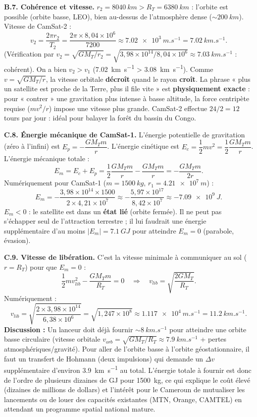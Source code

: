 \documentclass[11pt]{article}
\begin{document}
\begin{exoresolu}
\textbf{B.7. Cohérence et vitesse.} $r_2 = \SI{8040}{km} > R_T = \SI{6380}{km}$ : l'orbite est possible (orbite basse, LEO), bien au-dessus de l'atmosphère dense ($\sim \SI{200}{km}$).
Vitesse de CamSat-2 :
\[
v_2 = \frac{2\pi r_2}{T_2} = \frac{2\pi \times 8,04\times 10^{6}}{7200} \approx \SI{7,02e3}{m.s^{-1}} = \SI{7,02}{km.s^{-1}}.
\]
(Vérification par $v_2 = \sqrt{GM_T/r_2} = \sqrt{3,98\times 10^{14} / 8,04\times 10^{6}} \approx \SI{7,03}{km.s^{-1}}$ : cohérent).
On a bien $v_2 > v_1$ (\SI{7,02}{km.s^{-1}} > \SI{3,08}{km.s^{-1}}). Comme $v = \sqrt{GM_T/r}$, la vitesse orbitale \textbf{décroît} quand le rayon \textbf{croît}. La phrase « plus un satellite est proche de la Terre, plus il file vite » est \textbf{physiquement exacte} : pour « contrer » une gravitation plus intense à basse altitude, la force centripète requise ($mv^2/r$) impose une vitesse plus grande. CamSat-2 effectue $24/2 = 12$ tours par jour : idéal pour balayer la forêt du bassin du Congo.

\textbf{C.8. Énergie mécanique de CamSat-1.}
L'énergie potentielle de gravitation (zéro à l'infini) est $E_p = -\dfrac{G M_T m}{r}$.
L'énergie cinétique est $E_c = \dfrac{1}{2}m v^2 = \dfrac{1}{2}\dfrac{G M_T m}{r}$.
L'énergie mécanique totale :
\[
E_m = E_c + E_p = \frac{1}{2}\frac{G M_T m}{r} - \frac{G M_T m}{r} = -\frac{G M_T m}{2r}.
\]
Numériquement pour CamSat-1 ($m = \SI{1500}{kg}$, $r_1 = \SI{4,21e7}{m}$) :
\[
E_m = -\frac{3,98\times 10^{14} \times 1500}{2 \times 4,21\times 10^{7}}
\approx -\frac{5,97\times 10^{17}}{8,42\times 10^{7}}
\approx \SI{-7,09e9}{J}.
\]
$E_m < 0$ : le satellite est dans un \textbf{état lié} (orbite fermée). Il ne peut pas s'échapper seul de l'attraction terrestre ; il lui faudrait une énergie supplémentaire d'au moins $|E_m| = \SI{7,1}{GJ}$ pour atteindre $E_m = 0$ (parabole, évasion).

\textbf{C.9. Vitesse de libération.}
C'est la vitesse minimale à communiquer au sol ($r = R_T$) pour que $E_m = 0$ :
\[
\frac{1}{2}m v_{lib}^2 - \frac{G M_T m}{R_T} = 0
\quad\Longrightarrow\quad
\boxed{v_{lib} = \sqrt{\frac{2 G M_T}{R_T}}}.
\]
Numériquement :
\[
v_{lib} = \sqrt{\frac{2 \times 3,98\times 10^{14}}{6,38\times 10^{6}}}
= \sqrt{1,247\times 10^{8}} \approx \SI{1,117e4}{m.s^{-1}} = \SI{11,2}{km.s^{-1}}.
\]
\textbf{Discussion :} Un lanceur doit déjà fournir $\sim \SI{8}{km.s^{-1}}$ pour atteindre une orbite basse circulaire (vitesse orbitale $v_{orb} = \sqrt{GM_T/R_T} \approx \SI{7,9}{km.s^{-1}}$ + pertes atmosphériques/gravité). Pour aller de l'orbite basse à l'orbite géostationnaire, il faut un transfert de Hohmann (deux impulsions) qui demande un $\Delta v$ supplémentaire d'environ \SI{3,9}{km.s^{-1}} au total. L'énergie totale à fournir est donc de l'ordre de plusieurs dizaines de GJ pour \SI{1500}{kg}, ce qui explique le coût élevé (dizaines de millions de dollars) et l'intérêt pour le Cameroun de mutualiser les lancements ou de louer des capacités existantes (MTN, Orange, CAMTEL) en attendant un programme spatial national mature.
\end{exoresolu}
\end{document}
